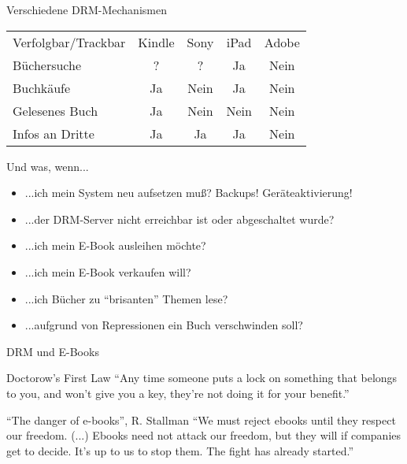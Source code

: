 \newcommand{\cellyes}{\cellcolor{red}Ja}
\newcommand{\cellunknown}{\cellcolor{yellow}?}
\newcommand{\cellno}{\cellcolor{green}Nein}

\begin{frame}{Verschiedene DRM-Mechanismen}
	\begin{tabular}{lcccc}
	Verfolgbar/Trackbar & Kindle & Sony & iPad & Adobe \\
	Büchersuche & \cellunknown & \cellunknown & \cellyes & \cellno \\
	Buchkäufe & \cellyes & \cellno & \cellyes & \cellno \\
	Gelesenes Buch & \cellyes & \cellno & \cellno & \cellno \\
	Infos an Dritte & \cellyes & \cellyes & \cellyes & \cellno \\
	\end{tabular}
\end{frame}

\begin{frame}{Und was, wenn...}
	\begin{itemize}
		\item ...ich mein System neu aufsetzen muß? Backups! Geräteaktivierung!
		\item ...der DRM-Server nicht erreichbar ist oder abgeschaltet wurde?
		\item ...ich mein E-Book ausleihen möchte?
		\item ...ich mein E-Book verkaufen will?
		\item ...ich Bücher zu "`brisanten"' Themen lese?
		\item ...aufgrund von Repressionen ein Buch verschwinden soll?
	\end{itemize}
\end{frame}

\begin{frame}{DRM und E-Books}
	\begin{block}{Doctorow's First Law}
		"`Any time someone puts a lock on something that belongs to you, and won’t give you a key, they’re not doing it for your benefit."'
	\end{block}
	\begin{block}{"`The danger of e-books"', R. Stallman}
		"`We must reject ebooks until they respect our freedom. (...) 
		Ebooks need not attack our freedom, but they will if companies get to decide. It's up to us to stop them. The fight has already started."'
	\end{block}
\end{frame}

